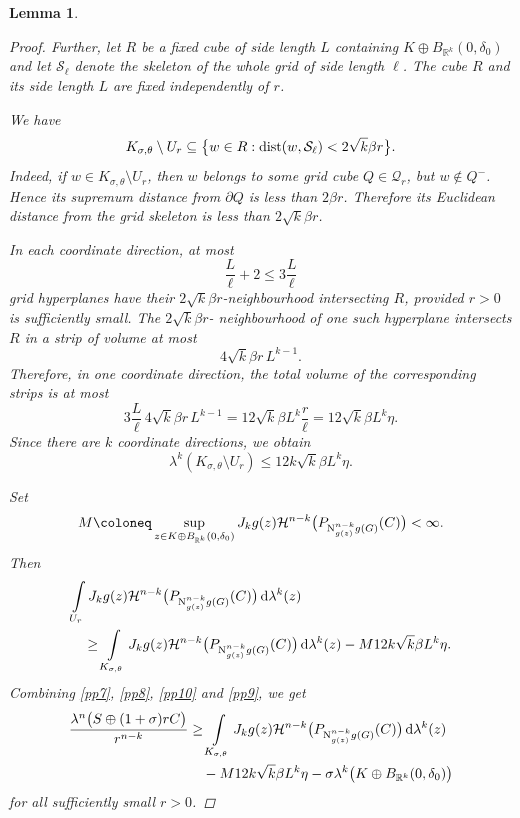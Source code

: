 \documentclass[pdflatex,sn-mathphys-num]{sn-jnl}
\theoremstyle{plain}
\newtheorem{lemma}[theorem]{Lemma}
\theoremstyle{definition}
\DeclareMathOperator{\dist}{\textup{dist}}
\newcommand{\dlambda}[1]{\,\mathrm d\lambda^{#1}}
\begin{document}
\begin{lemma}
\begin{proof}
Further, let $R$ be a fixed cube of side length $L$ containing $K\oplus B_{\mathbb{R}^k}(0, \delta_0)$ and let $\mathcal S_\ell$ denote the skeleton of the whole grid of side length $\ell$. 
The cube $R$ and its side length $L$ are fixed independently of $r$.

We have
\[
K_{\sigma,\theta}\setminus U_r
\subseteq
\big\{w\in R:\dist(w,\mathcal S_\ell)<2\sqrt{k}\beta r\big\}.
\]
Indeed, if $w\in K_{\sigma,\theta}\setminus U_r$, then $w$ belongs to some
grid cube $Q\in\mathcal Q_r$, but $w\notin Q^-$. Hence its supremum distance
from $\partial Q$ is less than $2\beta r$. Therefore its Euclidean distance
from the grid skeleton is less than $2\sqrt{k}\beta r$.

In each coordinate
direction, at most
\[
\frac{L}{\ell}+2\leq 3\frac{L}{\ell}
\]
grid hyperplanes have their \(2\sqrt{k}\beta r\)-neighbourhood intersecting
\(R\), provided \(r>0\) is sufficiently small. The \(2\sqrt{k}\beta r\)-
neighbourhood of one such hyperplane intersects \(R\) in a strip of volume at
most
\[
4\sqrt{k}\beta r\,L^{k-1}.
\]
Therefore, in one coordinate direction, the total volume of the corresponding
strips is at most
\[
3\frac{L}{\ell}\,4\sqrt{k}\beta r\,L^{k-1}
=
12\sqrt{k}\beta L^k\frac{r}{\ell}
=
12\sqrt{k}\beta L^k\eta.
\]
Since there are \(k\) coordinate directions, we obtain
\[
\lambda^k(K_{\sigma,\theta}\setminus U_r)
\leq
12k\sqrt{k}\beta L^k\eta.
\]

Set
\[
M\coloneq
\sup_{z\in K\oplus B_{\mathbb{R}^k}(0, \delta_0)}
J_kg(z)\mathcal{H}^{n-k}
\big(P_{\textup{N}^{n-k}_{g(z)}g(G)}(C)\big)
<\infty.
\]
Then
\begin{equation}\label{pp9}
\begin{split}
&\int\limits_{U_r}
J_kg(z)\mathcal H^{n-k}
\big(P_{\textup{N}^{n-k}_{g(z)}g(G)}(C)\big)\dlambda{k}(z)
\\
&\quad\geq
\int\limits_{K_{\sigma,\theta}}
J_kg(z)\mathcal H^{n-k}
\big(P_{\textup{N}^{n-k}_{g(z)}g(G)}(C)\big)\dlambda{k}(z)
-
M 12k\sqrt{k}\beta L^k\eta.
\end{split}
\end{equation}
Combining \eqref{pp7}, \eqref{pp8}, \eqref{pp10} and \eqref{pp9}, we get
\[
\begin{split}
\frac{\lambda^n\big(S\oplus(1+\sigma)rC\big)}{r^{n-k}}
&\geq
\int\limits_{K_{\sigma,\theta}}
J_kg(z)\mathcal{H}^{n-k}
\big(P_{\textup{N}^{n-k}_{g(z)}g(G)}(C)\big)\dlambda{k}(z)
\\
&\quad-
M 12k\sqrt{k}\beta L^k\eta
-
\sigma\lambda^k\big(K\oplus B_{\mathbb{R}^k}(0, \delta_0)\big)
\end{split}
\]
for all sufficiently small \(r>0\).


\end{proof}
\end{lemma}
\end{document}
